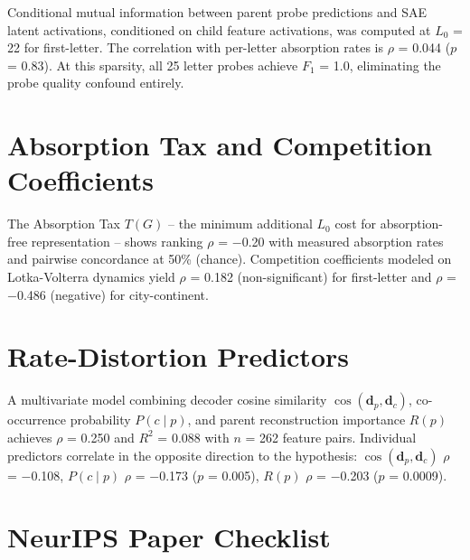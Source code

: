 \documentclass{article}
\begin{document}
Conditional mutual information between parent probe predictions and SAE latent activations, conditioned on child feature activations, was computed at $L_0$ = 22 for first-letter. The correlation with per-letter absorption rates is $\rho$ = 0.044 ($p$ = 0.83). At this sparsity, all 25 letter probes achieve $F_1$ = 1.0, eliminating the probe quality confound entirely.

\section{Absorption Tax and Competition Coefficients}
\label{app:tax}

The Absorption Tax $T(G)$ -- the minimum additional $L_0$ cost for absorption-free representation -- shows ranking $\rho$ = $-$0.20 with measured absorption rates and pairwise concordance at 50\% (chance). Competition coefficients modeled on Lotka-Volterra dynamics yield $\rho$ = 0.182 (non-significant) for first-letter and $\rho$ = $-$0.486 (negative) for city-continent.

\section{Rate-Distortion Predictors}
\label{app:ratedistortion}

A multivariate model combining decoder cosine similarity $\cos(\mathbf{d}_p, \mathbf{d}_c)$, co-occurrence probability $P(c \mid p)$, and parent reconstruction importance $R(p)$ achieves $\rho$ = 0.250 and $R^2$ = 0.088 with $n$ = 262 feature pairs. Individual predictors correlate in the opposite direction to the hypothesis: $\cos(\mathbf{d}_p, \mathbf{d}_c)$ $\rho$ = $-$0.108, $P(c \mid p)$ $\rho$ = $-$0.173 ($p$ = 0.005), $R(p)$ $\rho$ = $-$0.203 ($p$ = 0.0009).

\newpage
\section*{NeurIPS Paper Checklist}
\end{document}
